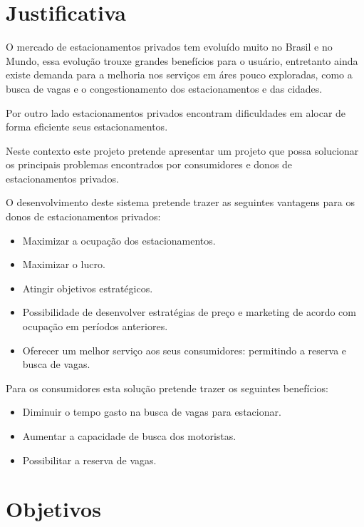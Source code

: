 
\section{Justificativa}

O mercado de estacionamentos privados tem evoluído muito no Brasil e no Mundo, essa evolução trouxe grandes benefícios para o usuário, entretanto ainda existe demanda para a melhoria nos serviços em áres pouco exploradas, como a busca de vagas e o congestionamento dos estacionamentos e das cidades.

Por outro lado estacionamentos privados encontram dificuldades em alocar de forma eficiente seus estacionamentos.

Neste contexto este projeto pretende apresentar um projeto que possa solucionar os principais problemas encontrados por consumidores e donos de estacionamentos privados.

O desenvolvimento deste sistema pretende trazer as seguintes vantagens para os donos de estacionamentos privados:
\begin{itemize}
	\item Maximizar a ocupação dos estacionamentos.%
	\item Maximizar o lucro.
	\item Atingir objetivos estratégicos.
	\item Possibilidade de desenvolver estratégias de preço e marketing de acordo com ocupação em períodos anteriores.
	\item Oferecer um melhor serviço aos seus consumidores: permitindo a reserva e busca de vagas.
\end{itemize}

Para os consumidores esta solução pretende trazer os seguintes benefícios:
\begin{itemize}
	\item Diminuir o tempo gasto na busca de vagas para estacionar.
	\item Aumentar a capacidade de busca dos motoristas.
	\item Possibilitar a reserva de vagas.
\end{itemize}

\section{Objetivos}


